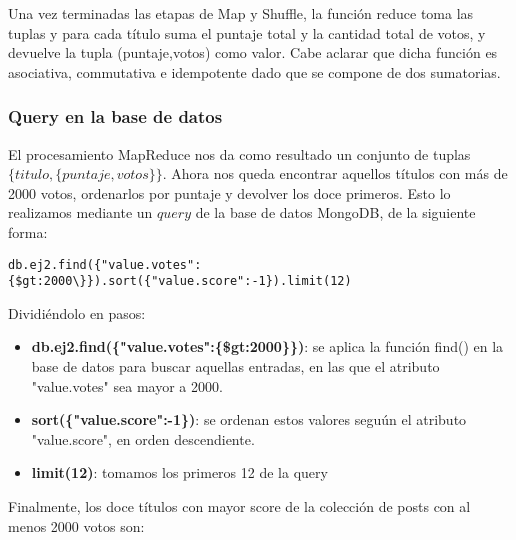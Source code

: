 Una vez terminadas las etapas de Map y Shuffle, la funci\'on reduce toma las tuplas y para cada t\'itulo suma el puntaje total y la cantidad total de votos, y devuelve la tupla (puntaje,votos) como valor. Cabe aclarar que dicha funci\'on es asociativa, commutativa e idempotente dado que se compone de dos sumatorias.

\vspace{2mm}

\subsubsection{Query en la base de datos}

El procesamiento MapReduce nos da como resultado un conjunto de tuplas $\{titulo, \{ puntaje, votos \}\}$. Ahora nos queda encontrar aquellos t\'itulos con m\'as de 2000 votos, ordenarlos por puntaje y devolver los doce primeros. Esto lo realizamos mediante un $query$ de la base de datos MongoDB, de la siguiente forma:

\vspace{2mm}

\begin{lstlisting}
db.ej2.find({"value.votes":{$gt:2000\}}).sort({"value.score":-1}).limit(12)
\end{lstlisting}

Dividi\'endolo en pasos:

\begin{itemize}

\item \textbf{db.ej2.find(\{"value.votes":\{\$gt:2000\}\})}: se aplica la funci\'on find() en la base de datos para buscar aquellas entradas, en las que el atributo "value.votes" sea mayor a 2000.

\item \textbf{sort(\{"value.score":-1\})}: se ordenan estos valores segu\'un el atributo "value.score", en orden descendiente.

\item \textbf{limit(12)}: tomamos los primeros 12 de la query

\end{itemize}

\vspace{2mm}

Finalmente, los doce t\'itulos con mayor score de la colecci\'on de posts con al menos 2000 votos son:

